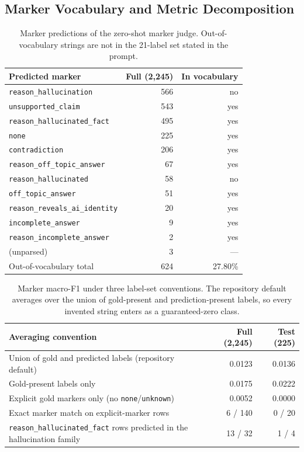 \documentclass{zapiski}
\begin{document}
\subsection{Marker Vocabulary and Metric Decomposition}
\label{sec:appendix-vocab}

\begin{table}[H]
\centering
\caption{Marker predictions of the zero-shot marker judge. Out-of-vocabulary
strings are not in the 21-label set stated in the prompt.}
\label{tab:marker-vocab}
\footnotesize
\begin{tabular}{lrr}
\toprule
Predicted marker & Full (2,245) & In vocabulary \\
\midrule
\texttt{reason\_hallucination}      & 566 & no \\
\texttt{unsupported\_claim}         & 543 & yes \\
\texttt{reason\_hallucinated\_fact} & 495 & yes \\
\texttt{none}                       & 225 & yes \\
\texttt{contradiction}              & 206 & yes \\
\texttt{reason\_off\_topic\_answer} &  67 & yes \\
\texttt{reason\_hallucinated}       &  58 & no \\
\texttt{off\_topic\_answer}         &  51 & yes \\
\texttt{reason\_reveals\_ai\_identity} & 20 & yes \\
\texttt{incomplete\_answer}         &   9 & yes \\
\texttt{reason\_incomplete\_answer} &   2 & yes \\
(unparsed)                          &   3 & --- \\
\midrule
Out-of-vocabulary total             & 624 & 27.80\% \\
\bottomrule
\end{tabular}
\end{table}

\begin{table}[H]
\centering
\caption{Marker macro-F1 under three label-set conventions. The repository
default averages over the union of gold-present and prediction-present labels,
so every invented string enters as a guaranteed-zero class.}
\label{tab:marker-decomposition}
\footnotesize
\begin{tabular}{lrr}
\toprule
Averaging convention & Full (2,245) & Test (225) \\
\midrule
Union of gold and predicted labels (repository default) & 0.0123 & 0.0136 \\
Gold-present labels only                                & 0.0175 & 0.0222 \\
Explicit gold markers only (no \texttt{none}/\texttt{unknown}) & 0.0052 & 0.0000 \\
\midrule
Exact marker match on explicit-marker rows & 6 / 140 & 0 / 20 \\
\texttt{reason\_hallucinated\_fact} rows predicted in the hallucination family & 13 / 32 & 1 / 4 \\
\bottomrule
\end{tabular}
\end{table}
\end{document}
